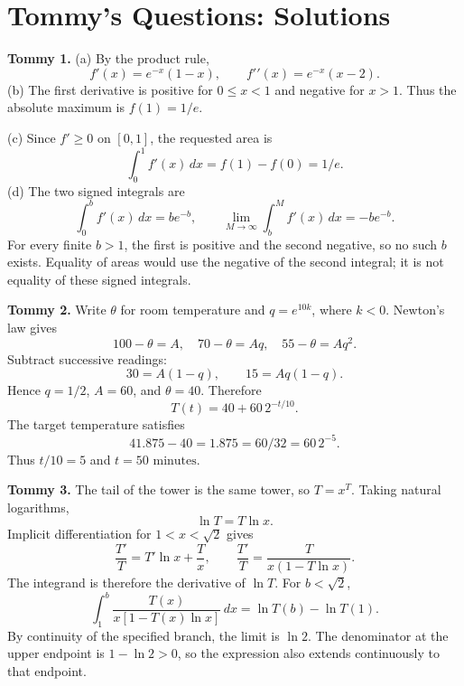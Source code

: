 \documentclass[11pt]{article}
\begin{document}
\clearpage\section*{Tommy's Questions: Solutions}
\textbf{Tommy 1.}
(a) By the product rule,
\[f\prime(x)=e^{-x}(1-x),\qquad f\prime\prime(x)=e^{-x}(x-2).\]
(b) The first derivative is positive for $0\leq x<1$ and negative for $x>1$. Thus the absolute maximum is $f(1)=1/e$.

(c) Since $f\prime\geq0$ on $[0,1]$, the requested area is
\[\int_0^1 f\prime(x)\,dx=f(1)-f(0)=1/e.\]
(d) The two signed integrals are
\[\int_0^b f\prime(x)\,dx=be^{-b},\qquad
\lim_{M\to\infty}\int_b^M f\prime(x)\,dx=-be^{-b}.\]
For every finite $b>1$, the first is positive and the second negative, so no such $b$ exists. Equality of areas would use the negative of the second integral; it is not equality of these signed integrals.

\bigskip\textbf{Tommy 2.}
Write $\theta$ for room temperature and $q=e^{10k}$, where $k<0$. Newton's law gives
\[100-\theta=A,\quad70-\theta=Aq,\quad55-\theta=Aq^2.\]
Subtract successive readings:
\[30=A(1-q),\qquad15=Aq(1-q).\]
Hence $q=1/2$, $A=60$, and $\theta=40$. Therefore
\[T(t)=40+60\,2^{-t/10}.\]
The target temperature satisfies
\[41.875-40=1.875=60/32=60\,2^{-5}.\]
Thus $t/10=5$ and $\boxed{t=50\text{ minutes}}$.

\bigskip\textbf{Tommy 3.}
The tail of the tower is the same tower, so $T=x^T$. Taking natural logarithms,
\[\ln T=T\ln x.\]
Implicit differentiation for $1<x<\sqrt2$ gives
\[\frac{T\prime}{T}=T\prime\ln x+\frac{T}{x},\qquad
\frac{T\prime}{T}=\frac{T}{x(1-T\ln x)}.\]
The integrand is therefore the derivative of $\ln T$. For $b<\sqrt2$,
\[\int_1^b\frac{T(x)}{x[1-T(x)\ln x]}\,dx=\ln T(b)-\ln T(1).\]
By continuity of the specified branch, the limit is $\boxed{\ln2}$. The denominator at the upper endpoint is $1-\ln2>0$, so the expression also extends continuously to that endpoint.
\clearpage
\end{document}
